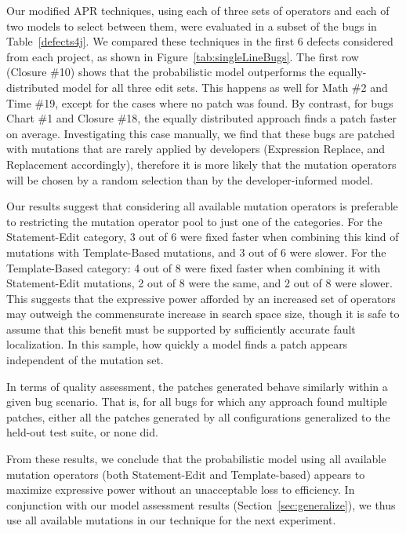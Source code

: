 \documentclass[conference]{IEEEtran}
\begin{document}
Our modified APR
techniques, using each of three sets of operators and each of two models to
select between them, were evaluated in a subset of the bugs in Table~\ref{defects4j}. We compared these techniques in the first 6 defects considered from each project, as shown in 
Figure~\ref{tab:singleLineBugs}.
The first row (Closure \#10) shows that the
probabilistic model outperforms the equally-distributed model for all three
edit sets.  This happens as well for
Math \#2 and Time \#19, except for the cases where no patch was
found. By contrast, for bugs Chart \#1 and Closure \#18, the equally
distributed approach finds a patch faster on average. Investigating this case
manually, we find that 
these bugs are patched with mutations that are rarely applied by developers (Expression Replace, and Replacement accordingly),
therefore it is more likely that the mutation operators will be chosen by a
random selection than by the developer-informed model.

Our results suggest that considering all available mutation operators is
preferable to 
restricting the mutation operator pool to just one of the categories. For the
Statement-Edit category, 3 out of 6 were fixed faster when combining this kind of mutations with
Template-Based mutations, and 3 out of 6 were slower. For the Template-Based
category: 4 out of 8 were fixed faster when combining it with Statement-Edit
mutations, 2 out of 8 were the same, and 2 out of 8 were slower. This suggests
that the expressive power afforded by an increased set of operators may
outweigh the commensurate increase in search space size, though it is safe to
assume that this benefit must be supported by sufficiently accurate fault
localization. 
%
In this sample, how quickly a model finds a patch appears independent of the mutation
set. 

In terms of
quality assessment, the patches generated behave similarly within a given bug scenario.
That is, for all bugs for which any approach found multiple
patches, either all the patches generated by all configurations
generalized to the held-out test suite, or none did. 

From these results, we conclude that the probabilistic model using all available
mutation operators (both Statement-Edit and Template-based) appears to maximize
expressive power without an unacceptable loss to efficiency.  In conjunction
with our model assessment results (Section~\ref{sec:generalize}), we thus use
all available mutations in our technique for the next experiment. 
\end{document}
